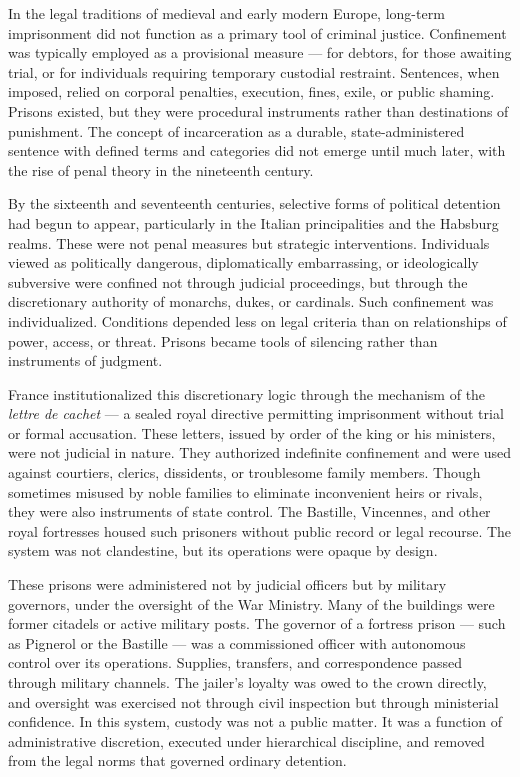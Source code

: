 In the legal traditions of medieval and early modern Europe, long-term imprisonment did not function as a primary tool of criminal justice. Confinement was typically employed as a provisional measure — for debtors, for those awaiting trial, or for individuals requiring temporary custodial restraint. Sentences, when imposed, relied on corporal penalties, execution, fines, exile, or public shaming. Prisons existed, but they were procedural instruments rather than destinations of punishment. The concept of incarceration as a durable, state-administered sentence with defined terms and categories did not emerge until much later, with the rise of penal theory in the nineteenth century.

By the sixteenth and seventeenth centuries, selective forms of political detention had begun to appear, particularly in the Italian principalities and the Habsburg realms. These were not penal measures but strategic interventions. Individuals viewed as politically dangerous, diplomatically embarrassing, or ideologically subversive were confined not through judicial proceedings, but through the discretionary authority of monarchs, dukes, or cardinals. Such confinement was individualized. Conditions depended less on legal criteria than on relationships of power, access, or threat. Prisons became tools of silencing rather than instruments of judgment.

France institutionalized this discretionary logic through the mechanism of the \textit{lettre de cachet } — a sealed royal directive permitting imprisonment without trial or formal accusation. These letters, issued by order of the king or his ministers, were not judicial in nature. They authorized indefinite confinement and were used against courtiers, clerics, dissidents, or troublesome family members. Though sometimes misused by noble families to eliminate inconvenient heirs or rivals, they were also instruments of state control. The Bastille, Vincennes, and other royal fortresses housed such prisoners without public record or legal recourse. The system was not clandestine, but its operations were opaque by design.

These prisons were administered not by judicial officers but by military governors, under the oversight of the War Ministry. Many of the buildings were former citadels or active military posts. The governor of a fortress prison — such as Pignerol or the Bastille — was a commissioned officer with autonomous control over its operations. Supplies, transfers, and correspondence passed through military channels. The jailer’s loyalty was owed to the crown directly, and oversight was exercised not through civil inspection but through ministerial confidence. In this system, custody was not a public matter. It was a function of administrative discretion, executed under hierarchical discipline, and removed from the legal norms that governed ordinary detention.

